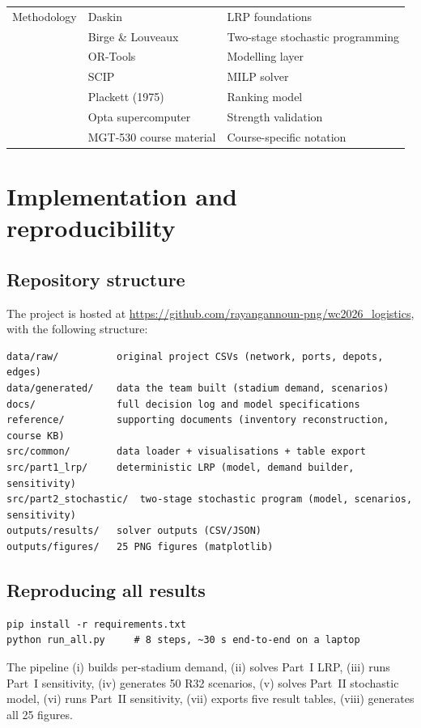 \documentclass[11pt,a4paper]{article}
\numberwithin{equation}{section}
\begin{document}
\begin{longtable}{@{}p{} p{} p{}@{}}
Methodology      & Daskin \cite{daskin_location}                          & LRP foundations \\
                 & Birge \& Louveaux \cite{birge_louveaux}                & Two-stage stochastic programming \\
                 & OR-Tools \cite{ortools}                                 & Modelling layer \\
                 & SCIP \cite{scip}                                        & MILP solver \\
                 & Plackett (1975) \cite{plackett1975}                    & Ranking model \\
                 & Opta supercomputer \cite{opta_supercomputer}            & Strength validation \\
                 & MGT-530 course material \cite{gallay_mgt530}           & Course-specific notation \\
\end{longtable}

\section{Implementation and reproducibility}\label{app:reproducibility}
\setcounter{figure}{0}
\setcounter{table}{0}

\subsection*{Repository structure}
The project is hosted at \url{https://github.com/rayangannoun-png/wc2026_logistics}, with the following structure:
\begin{verbatim}
data/raw/          original project CSVs (network, ports, depots, edges)
data/generated/    data the team built (stadium demand, scenarios)
docs/              full decision log and model specifications
reference/         supporting documents (inventory reconstruction, course KB)
src/common/        data loader + visualisations + table export
src/part1_lrp/     deterministic LRP (model, demand builder, sensitivity)
src/part2_stochastic/  two-stage stochastic program (model, scenarios, sensitivity)
outputs/results/   solver outputs (CSV/JSON)
outputs/figures/   25 PNG figures (matplotlib)
\end{verbatim}

\subsection*{Reproducing all results}
\begin{verbatim}
pip install -r requirements.txt
python run_all.py     # 8 steps, ~30 s end-to-end on a laptop
\end{verbatim}
The pipeline (i) builds per-stadium demand, (ii) solves Part~I LRP, (iii) runs Part~I sensitivity, (iv) generates 50 R32 scenarios, (v) solves Part~II stochastic model, (vi) runs Part~II sensitivity, (vii) exports five result tables, (viii) generates all 25 figures.
\end{document}
